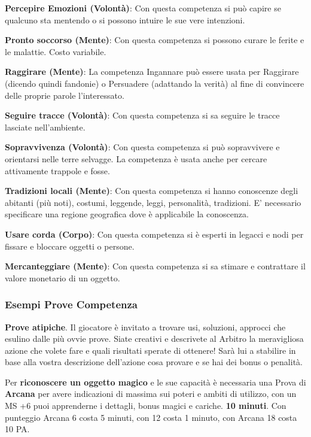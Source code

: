 \documentclass[12pt,a4paper,twoside,openany]{book}
\begin{document}
\begin{multicols}{2}
\textbf{Percepire Emozioni (Volontà)}: Con questa competenza si può capire se qualcuno sta mentendo o si possono intuire le sue vere intenzioni.

\textbf{Pronto soccorso (Mente)}: Con questa competenza si possono curare le ferite e le malattie. Costo variabile.

\textbf{Raggirare (Mente)}: La competenza Ingannare può essere usata per Raggirare (dicendo quindi fandonie) o Persuadere (adattando la verità) al fine di convincere delle proprie parole l'interessato.

\textbf{Seguire tracce (Volontà)}: Con questa competenza si sa seguire le tracce lasciate nell'ambiente. 

\textbf{Sopravvivenza (Volontà)}: Con questa competenza si può sopravvivere e orientarsi nelle terre selvagge. La competenza è usata anche per cercare attivamente trappole e fosse.

\textbf{Tradizioni locali (Mente)}: Con questa competenza si hanno conoscenze degli abitanti (più noti), costumi, leggende, leggi, personalità, tradizioni. E' necessario specificare una regione geografica dove è applicabile la conoscenza. 

\textbf{Usare corda (Corpo)}: Con questa competenza si è esperti in legacci e nodi per fissare e bloccare oggetti o persone. 

\textbf{Mercanteggiare (Mente)}: Con questa competenza si sa stimare e contrattare il valore monetario di un oggetto.

\subsubsection{Esempi Prove Competenza}\label{esempiprovecompetenza}\hypertarget{esempiprovecompetenze}{}

\textbf{Prove atipiche}. Il giocatore è invitato a trovare usi, soluzioni, approcci che esulino dalle più ovvie prove. Siate creativi e descrivete al Arbitro la meravigliosa azione che volete fare e quali risultati sperate di ottenere! Sarà lui a stabilire in base alla vostra descrizione dell'azione cosa provare e se hai dei bonus o penalità.

\medskip

Per \textbf{riconoscere un oggetto magico} e le sue capacità è necessaria una Prova di \textbf{Arcana} per avere indicazioni di massima sui poteri e ambiti di utilizzo, con un MS +6 puoi apprenderne i dettagli, bonus magici e cariche. \textbf{10 minuti}. Con punteggio Arcana 6 costa 5 minuti, con 12 costa 1 minuto, con Arcana 18 costa 10 PA.


\end{multicols}
\end{document}
